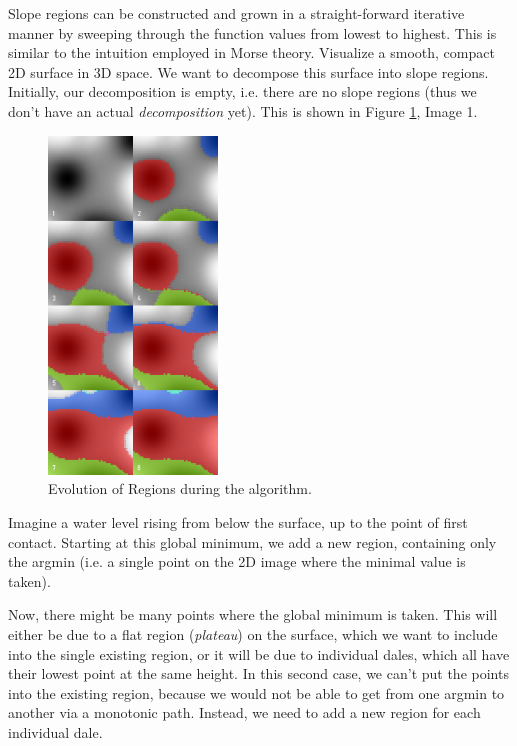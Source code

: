 \documentclass[a4paper,12pt,notitlepage,fullpage]{paper}
\theoremstyle{plain}
\theoremstyle{definition}
\begin{document}
Slope regions can be constructed and grown in a straight-forward iterative manner by sweeping through the function values from lowest to highest. 
This is similar to the intuition employed in Morse theory\cite{MatsumotoYukio2002AitM}.
Visualize a smooth, compact 2D surface in 3D space.
We want to decompose this surface into slope regions.
Initially, our decomposition is empty, i.e. there are no slope regions (thus we don't have an actual \emph{decomposition} yet). This is shown in Figure \ref{fig:evolution}, Image 1.

\begin{figure}
\centering
\includegraphics[width=0.4\textwidth]{img/slope_evolution.png}
\caption{Evolution of Regions during the algorithm.}
\label{fig:evolution}
\end{figure}

Imagine a water level rising from below the surface, up to the point of first contact.
Starting at this global minimum, we add a new region, containing only the argmin (i.e. a single point on the 2D image where the minimal value is taken).

Now, there might be many points where the global minimum is taken.
This will either be due to a flat region (\emph{plateau}) on the surface, which we want to include into the single existing region, or it will be due to individual dales, which all have their lowest point at the same height.
In this second case, we can't put the points into the existing region, because we would not be able to get from one argmin to another via a monotonic path.
Instead, we need to add a new region for each individual dale.
\end{document}
